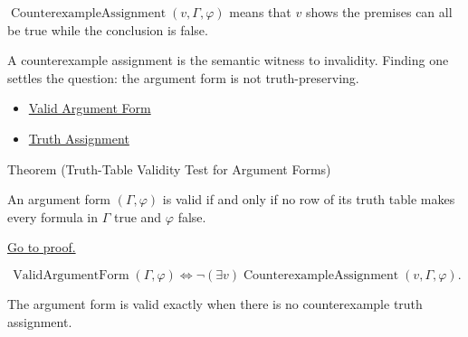 \begin{remark*}
\(\operatorname{CounterexampleAssignment}(v,\Gamma,\varphi)\) means that \(v\)
shows the premises can all be true while the conclusion is false.
\end{remark*}

\begin{remark*}[Interpretation]
A counterexample assignment is the semantic witness to invalidity. Finding one
settles the question: the argument form is not truth-preserving.
\end{remark*}

\begin{dependencies}
\begin{itemize}
  \item \hyperref[def:valid-argument-form-propositional-logic]{Valid Argument Form}
  \item \hyperref[def:truth-assignment-propositional-logic]{Truth Assignment}
\end{itemize}
\end{dependencies}

\begin{theorembox}{Theorem (Truth-Table Validity Test for Argument Forms)}
\begin{theorem}
\label{thm:truth-table-validity-test-argument-forms-propositional-logic}
An argument form \((\Gamma,\varphi)\) is valid if and only if no row of its truth
table makes every formula in \(\Gamma\) true and \(\varphi\) false.

\noindent\hyperref[prf:truth-table-validity-test-argument-forms-propositional-logic]{Go to proof.}
\end{theorem}
\end{theorembox}

\begin{remark*}
\[
\operatorname{ValidArgumentForm}(\Gamma,\varphi)
\Longleftrightarrow
\neg(\exists v)\operatorname{CounterexampleAssignment}(v,\Gamma,\varphi).
\]
\end{remark*}

\begin{remark*}
The argument form is valid exactly when there is no counterexample truth
assignment.
\end{remark*}

